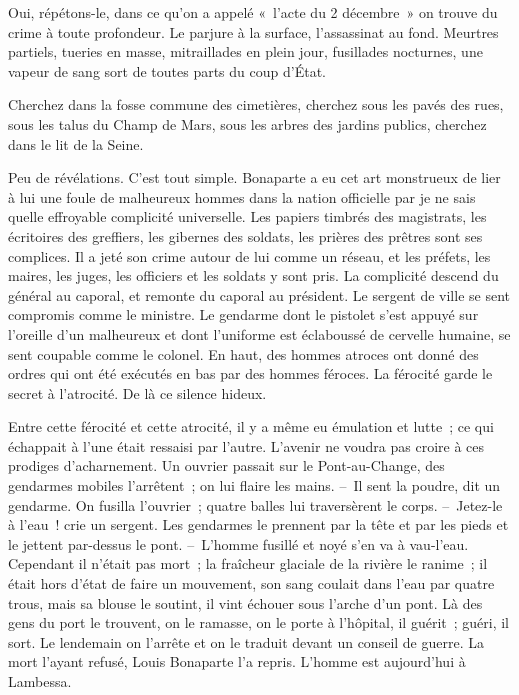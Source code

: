\documentclass[french,twoside]{book} %
\begin{document}
Oui, répétons-le, dans ce qu’on a appelé « l’acte du 2 décembre » on trouve du crime à toute profondeur. Le parjure à la surface, l’assassinat au fond. Meurtres partiels, tueries en masse, mitraillades en plein jour, fusillades nocturnes, une vapeur de sang sort de toutes parts du coup d’État.\par
Cherchez dans la fosse commune des cimetières, cherchez sous les pavés des rues, sous les talus du Champ de Mars, sous les arbres des jardins publics, cherchez dans le lit de la Seine.\par
Peu de révélations. C’est tout simple. Bonaparte a eu cet art monstrueux de lier à lui une foule de malheureux hommes dans la nation officielle par je ne sais quelle effroyable complicité universelle. Les papiers timbrés des magistrats, les écritoires des greffiers, les gibernes des soldats, les prières des prêtres sont ses complices. Il a jeté son crime autour de lui comme un réseau, et les préfets, les maires, les juges, les officiers et les soldats y sont pris. La complicité descend du général au caporal, et remonte du caporal au président. Le sergent de ville se sent compromis comme le ministre. Le gendarme dont le pistolet s’est appuyé sur l’oreille d’un malheureux et dont l’uniforme est éclaboussé de cervelle humaine, se sent coupable comme le colonel. En haut, des hommes atroces ont donné des ordres qui ont été exécutés en bas par des hommes féroces. La férocité garde le secret à l’atrocité. De là ce silence hideux.\par
Entre cette férocité et cette atrocité, il y a même eu émulation et lutte ; ce qui échappait à l’une était ressaisi par l’autre. L’avenir ne voudra pas croire à ces prodiges d’acharnement. Un ouvrier passait sur le Pont-au-Change, des gendarmes mobiles l’arrêtent ; on lui flaire les mains. – Il sent la poudre, dit un gendarme. On fusilla l’ouvrier ; quatre balles lui traversèrent le corps. – Jetez-le à l’eau ! crie un sergent. Les gendarmes le prennent par la tête et par les pieds et le jettent par-dessus le pont. – L’homme fusillé et noyé s’en va à vau-l’eau. Cependant il n’était pas mort ; la fraîcheur glaciale de la rivière le ranime ; il était hors d’état de faire un mouvement, son sang coulait dans l’eau par quatre trous, mais sa blouse le soutint, il vint échouer sous l’arche d’un pont. Là des gens du port le trouvent, on le ramasse, on le porte à l’hôpital, il guérit ; guéri, il sort. Le lendemain on l’arrête et on le traduit devant un conseil de guerre. La mort l’ayant refusé, Louis Bonaparte l’a repris. L’homme est aujourd’hui à Lambessa.\par
\end{document}
